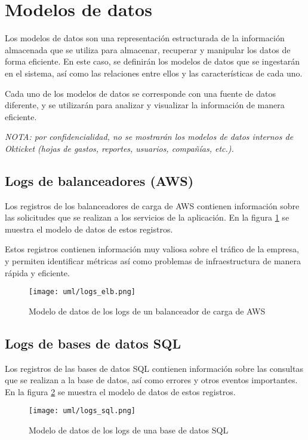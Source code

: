 \section{Modelos de datos}\label{sec:modelo}
Los modelos de datos son una representación estructurada de la información
almacenada que se utiliza para almacenar, recuperar y manipular los datos de
forma eficiente. En este caso, se definirán los modelos de datos que se
ingestarán en el sistema, así como las relaciones entre ellos y las
características de cada uno.

Cada uno de los modelos de datos se corresponde con una fuente de datos
diferente, y se utilizarán para analizar y visualizar la información de manera
eficiente.

\emph{NOTA: por confidencialidad, no se mostrarán los modelos de datos internos
de Okticket (hojas de gastos, reportes, usuarios, compañías, etc.).}


\newpage{}
\subsection{Logs de balanceadores (AWS)}
Los registros de los balanceadores de carga de AWS contienen información
sobre las solicitudes que se realizan a los servicios de la aplicación. En la
figura \ref{fig:logs_elb} se muestra el modelo de datos de estos registros.

Estos registros contienen información muy valiosa sobre el tráfico de la
empresa, y permiten identificar métricas así como problemas de infraestructura
de manera rápida y eficiente.

\begin{figure}[H]
	\centering
	\texttt{[image: uml/logs\_elb.png]}
	\caption{Modelo de datos de los logs de un balanceador de carga de AWS}
	\label{fig:logs_elb}
\end{figure}


\newpage{}
\subsection{Logs de bases de datos SQL}
Los registros de las bases de datos SQL contienen información sobre las
consultas que se realizan a la base de datos, así como errores y otros eventos
importantes. En la figura \ref{fig:logs_sql} se muestra el modelo de datos de
estos registros.

\begin{figure}[H]
	\centering
	\texttt{[image: uml/logs\_sql.png]}
	\caption{Modelo de datos de los logs de una base de datos SQL}
	\label{fig:logs_sql}
\end{figure}


